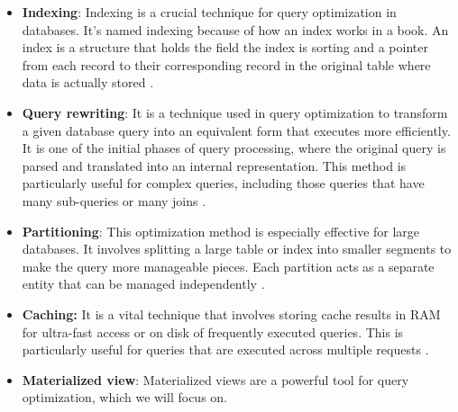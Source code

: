  \begin{itemize}
     \item \textbf{Indexing}: Indexing is a crucial technique for query optimization in databases. It's named indexing because of how an index works in a book. An index is a structure that holds the field the index is sorting and a pointer from each record to their corresponding record in the original table where data is actually stored \cite{tomar-2021,atlassian-no-date}.
     \item \textbf{Query rewriting}: It is a technique used in query optimization to transform a given database query into an equivalent form that executes more efficiently. It is one of the initial phases of query processing, where the original query is parsed and translated into an internal representation. This method is particularly useful for complex queries, including those queries that have many sub-queries or many joins \cite{pitoura-2009,unknown-IBM-25-2024}.
     
     \item \textbf{Partitioning}: This optimization method is especially effective for large databases. It involves splitting a large table or index into smaller segments to make the query more manageable pieces. Each partition acts as a separate entity that can be managed independently \cite{planck-2024}.
     
     \item \textbf{Caching:} It is a vital technique that involves storing cache results in RAM for ultra-fast access or on disk of frequently executed queries. This is particularly useful for queries that are executed across multiple requests \cite{Bit-Fetch-2024}.
     
     \item \textbf{Materialized view}: Materialized views are a powerful tool for query optimization, which we will focus on. 
 \end{itemize}
 
